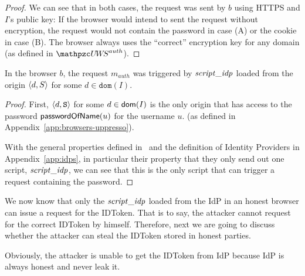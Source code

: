 \begin{proof}
    We can see that in both cases, the request was sent by $b$ 
    using HTTPS and $I$'s public key: If the browser would 
    intend to sent the request without encryption, the request 
    would not contain the password in case (A) or the cookie in 
    case (B). The browser always uses the ``correct'' encryption 
    key for any domain (as defined in $\uppressoauthwebsystem$).
  \end{proof}
  
  \begin{lemma}\label{lemma:script-idp-trigger-request} %
    In the browser $b$, the request $m_{auth}$ was triggered by $\mathit{script\_idp}$ 
    loaded from the origin $\langle {{}d, S} \rangle$ for some $d \in \mathtt{dom}(I)$.
  \end{lemma}
  \begin{proof}
    First, $\langle d,\mathtt{S}\rangle$ for some $d \in \mathsf{dom}(I)$ is the 
    only origin that has access to the password $\mathsf{passwordOfName}(u)$ for 
    the username $u$.
    (as defined in Appendix~\ref{app:browsers-uppresso}).
  
    With the general properties defined in~\cite{BrowserID} and the
    definition of Identity Providers in Appendix~\ref{app:idps}, in
    particular their property that they only send out one script,
    $\mathit{script\_idp}$, we can see that this is the only script that can
    trigger a request containing the password.
  \end{proof}

  We now know that only the $\mathit{script\_idp}$ loaded from the IdP 
  in an honest browser can issue a request for the IDToken. 
  That is to say, the attacker cannot request for the correct IDToken 
  by himself. Therefore, next we are going to discuss whether the attacker
  can steal the IDToken stored in honest parties.

  Obviously, the attacker is unable to get the IDToken from IdP because IdP 
  is always honest and never leak it.
  
